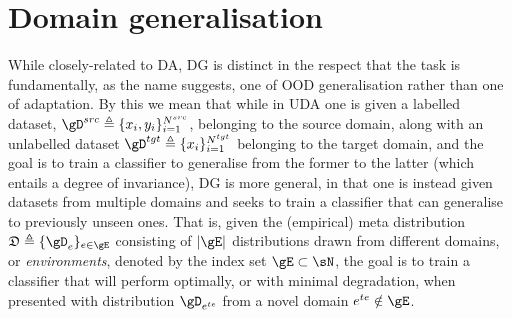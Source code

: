 \section{Domain generalisation}\label{sec:domain_generalisation}
While closely-related to \ac{DA}, \acf{DG} is distinct in the respect that the task is
fundamentally, as the name suggests, one of \ac{OOD} generalisation rather than one of adaptation.
%
By this we mean that while in \ac{UDA} one is given a labelled dataset, \( \gD^{src} \triangleq
\{x_i, y_i \}_{i=1}^{N^{src}} \), belonging to the source domain, along with an unlabelled
dataset \( \gD^{tgt} \triangleq \{ x_i \}_{i=1}^{N^{tgt}} \) belonging to the target domain,
and the goal is to train a classifier to generalise from the former to the latter (which entails a
degree of invariance), \ac{DG} is more general, in that one is instead given datasets from multiple
domains and seeks to train a classifier that can generalise to previously unseen ones. 
%
That is, given the (empirical) meta distribution \( \mathfrak{D} \triangleq \{\gD_e \}_{e \in \gE}
\) consisting of \( |\gE| \) distributions drawn from different domains, or \emph{environments},
denoted by the index set \( \gE \subset \sN \), the goal is to train a classifier that will perform
optimally, or with minimal degradation, when presented with distribution \( \gD_{e^{te}} \) from a
novel domain \( e^{te} \notin  \gE \).

